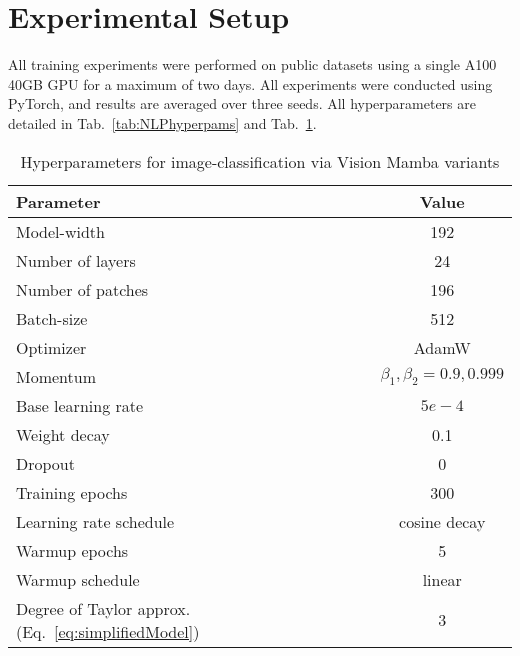
\section{Experimental Setup \label{sec:hyperParams}} 
All training experiments were performed
on public datasets using a single A100 40GB GPU for a
maximum of two days. All experiments were conducted using PyTorch, and results are averaged over three seeds. All hyperparameters are detailed in Tab.~\ref{tab:NLPhyperpams} and Tab.~\ref{tab:Vsionhyperpams}.

\begin{table}[h]
\centering
\small
\begin{tabular}{l c}
\toprule
\textbf{Parameter} & \textbf{Value} \\
\midrule
Model-width & 192 \\
Number of layers & 24 \\
Number of patches & 196 \\
Batch-size & 512 \\
Optimizer & AdamW \\
Momentum & \( \beta_1, \beta_2 = 0.9, 0.999 \) \\
Base learning rate & $5e-4$ \\
Weight decay & 0.1 \\
Dropout & 0 \\
Training epochs & 300 \\
Learning rate schedule & cosine decay \\
Warmup epochs & 5 \\
Warmup schedule & linear \\ 
Degree of Taylor approx. (Eq.~\ref{eq:simplifiedModel}) & 3 \\
\bottomrule
\end{tabular}
\caption{Hyperparameters for image-classification via Vision Mamba variants} 
\label{tab:Vsionhyperpams}
\end{table}

